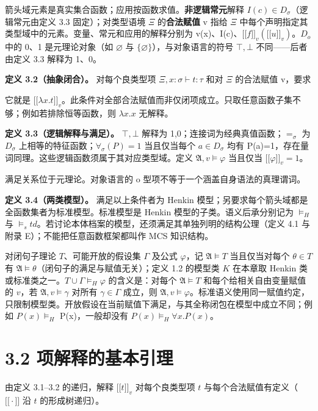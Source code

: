 \documentclass[UTF8,a4paper,zihao=-4,fontset=windows,openany]{ctexbook}
\newcommand{\mcsdisplay}[1]{%
  \par\addvspace{0.7em}%
  \sbox{\mcsmathbox}{\ensuremath{\displaystyle #1}}%
  \ifdim\wd\mcsmathbox>\linewidth
    \noindent\resizebox{\linewidth}{!}{\usebox{\mcsmathbox}}%
  \else
    \noindent\hspace*{\fill}\usebox{\mcsmathbox}\hspace*{\fill}%
  \fi
  \par\addvspace{0.7em}%
}
\def\ensuremath#1{#1}%
\def\text#1{#1}%
\def\mathrm#1{#1}%
\providecommand{\llbracket}{\mathopen{[\![}}
\providecommand{\rrbracket}{\mathclose{]\!]}}
\begin{document}
\mcsdisplay{D_{\sigma\to\tau}\subseteq D_\tau^{D_\sigma}.}
\noindent 箭头域元素是真实集合函数；应用按函数求值。\textbf{非逻辑常元}解释 \(I(c)\in D_\sigma\)（逻辑常元由定义 3.3 固定）；对类型语境 \(\Xi\) 的\textbf{合法赋值} v 指给 \(\Xi\) 中每个声明指定其类型域中的元素。变量、常元和应用的解释分别为 v(x)、I(c)、\(\llbracket f\rrbracket_v(\llbracket u\rrbracket_v)\)。\(D_o\) 中的 0、1 是元理论对象（如 \(\varnothing\) 与 \(\{\varnothing\}\)），与对象语言的符号 \(\top,\bot\) 不同——后者由定义 3.3 解释为 1、0。

\textbf{定义 3.2（抽象闭合）。} 对每个良类型项 \(\Xi,x:\sigma\vdash t:\tau\) 和对 \(\Xi\) 的合法赋值 v，要求


\mcsdisplay{a\longmapsto\llbracket t\rrbracket_{v[x:=a]}
\quad\text{属于 }D_{\sigma\to\tau}.}
\noindent 它就是 \(\llbracket\lambda x.t\rrbracket_v\)。此条件对全部合法赋值而非仅闭项成立。只取任意函数子集不够；例如若排除恒等函数，则 \(\lambda x.x\) 无解释。

\textbf{定义 3.3（逻辑解释与满足）。} \(\top,\bot\) 解释为 1,0；连接词为经典真值函数；\(=_\sigma\) 为 \(D_\sigma\) 上相等的特征函数；\(\forall_\sigma(P)=1\) 当且仅当每个 \(a\in D_\sigma\) 均有 P(a)=1，存在量词同理。这些逻辑函数须属于其对应类型域。定义 \(\mathfrak A,v\models\varphi\) 当且仅当 \(\llbracket\varphi\rrbracket_v=1\)。

满足关系位于元理论。对象语言的 o 型项不等于一个涵盖自身语法的真理谓词。

\textbf{定义 3.4（两类模型）。} 满足以上条件者为 Henkin 模型；另要求每个箭头域都是全函数集者为标准模型。标准模型是 Henkin 模型的子类。语义后承分别记为 \(\vDash_H\) 与 \(\vDash_\mathrm{std}\)。若讨论本体档案的模型，还须满足其单独列明的结构公理（定义 4.1 与附录 E）；不能把任意函数框架都叫作 MCS 知识结构。

对闭句子理论 \(T\)、可能开放的假设集 \(\Gamma\) 及公式 \(\varphi\)，记 \(\mathfrak A\models T\) 当且仅当对每个 \(\theta\in T\) 有 \(\mathfrak A\models\theta\)（闭句子的满足与赋值无关）；定义 1.2 的模型类 \(K\) 在本章取 Henkin 类或标准类之一。\(T\cup\Gamma\models_H\varphi\) 的含义是：对每个 \(\mathfrak A\models T\) 和每个给相关自由变量赋值的 \(v\)，若 \(\mathfrak A,v\models\gamma\) 对所有 \(\gamma\in\Gamma\) 成立，则 \(\mathfrak A,v\models\varphi\)。标准语义使用同一赋值约定，只限制模型类。开放假设在当前赋值下满足，与其全称闭包在模型中成立不同；例如 \(P(x)\vDash_H\) P(x)，一般却没有 \(P(x)\vDash_H\forall x.P(x)\)。

\section{3.2 项解释的基本引理}
由定义 3.1–3.2 的递归，解释 \(\llbracket t\rrbracket_v\) 对每个良类型项 \(t\) 与每个合法赋值有定义（\(\llbracket\cdot\rrbracket\) 沿 \(t\) 的形成树递归）。
\end{document}
